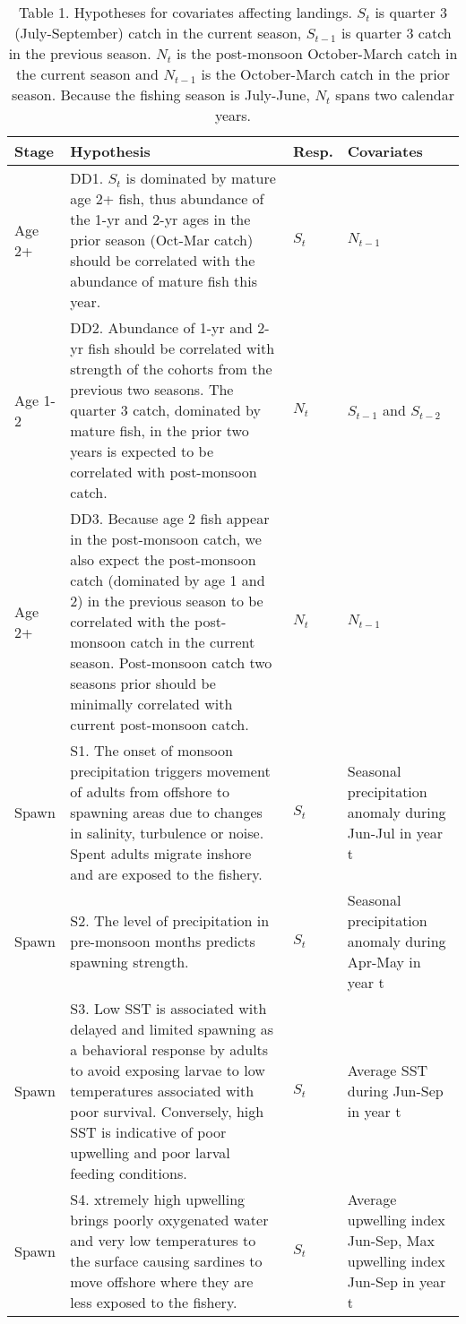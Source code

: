 
\begin{table}[t]

\caption{\label{tab:print-table-hyp}Table 1. Hypotheses for covariates affecting landings.  $S_t$ is quarter 3 (July-September) catch in the current season, $S_{t-1}$ is quarter 3 catch in the previous season. $N_t$ is the post-monsoon October-March catch in the current season and $N_{t-1}$ is the October-March catch in the prior season. Because the fishing season is July-June, $N_t$ spans two calendar years.}
\centering
\begin{tabular}{>{\raggedright\arraybackslash}p{1cm}|>{\raggedright\arraybackslash}p{8.5cm}|>{\raggedright\arraybackslash}p{1cm}|>{\raggedright\arraybackslash}p{3cm}}
\hline
Stage & Hypothesis & Resp. & Covariates\\
\hline
Age 2+ & DD1.  $S_t$ is dominated by mature age 2+ fish, thus abundance of the 1-yr and 2-yr ages in the prior season (Oct-Mar catch) should be correlated with the abundance of mature fish this year. & $S_t$ & $N_{t-1}$\\
\hline
Age 1-2 & DD2.  Abundance of 1-yr and 2-yr fish should be correlated with strength of the cohorts from the previous two seasons.  The quarter 3 catch, dominated by mature fish, in the prior two years is expected to be correlated with post-monsoon catch. & $N_t$ & $S_{t-1}$ and $S_{t-2}$\\
\hline
Age 2+ & DD3.  Because age 2 fish appear in the post-monsoon catch, we also expect the post-monsoon catch (dominated by age 1 and 2) in the previous season to be correlated with the post-monsoon catch in the current season. Post-monsoon catch two seasons prior should be minimally correlated with current post-monsoon catch. & $N_t$ & $N_{t-1}$\\
\hline
Spawn & S1.  The onset of monsoon precipitation triggers movement of adults from offshore to spawning areas due to changes in salinity, turbulence or noise. Spent adults migrate inshore and are exposed to the fishery. & $S_t$ & Seasonal precipitation anomaly during Jun-Jul in year t\\
\hline
Spawn & S2.  The level of precipitation in pre-monsoon months predicts spawning strength. & $S_t$ & Seasonal precipitation anomaly during Apr-May in year t\\
\hline
Spawn & S3.  Low SST is associated with delayed and limited spawning as a behavioral response by adults to avoid exposing larvae to low temperatures associated with poor survival. Conversely, high SST is indicative of poor upwelling and poor larval feeding conditions. & $S_t$ & Average SST during Jun-Sep in year t\\
\hline
Spawn & S4.  xtremely high upwelling brings poorly oxygenated water and very low temperatures to the surface causing sardines to move offshore where they are less exposed to the fishery. & $S_t$ & Average upwelling index Jun-Sep, Max upwelling index Jun-Sep in year t\\
\hline
\end{tabular}
\end{table}

